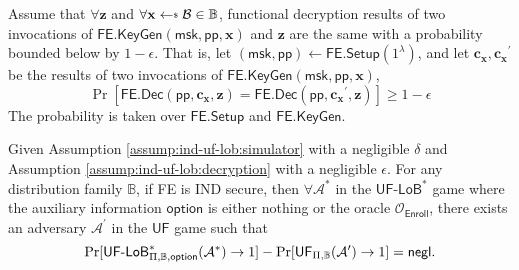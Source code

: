 \begin{assumption}
\label{assump:ind-uf-lob:decryption}
	Assume that $\forall \mathbf{z}$ and $\forall \mathbf{x} \getsdollar \mathcal{B} \in \mathbb{B}$, functional decryption results of two invocations of $\textsf{FE.KeyGen}( \textsf{msk}, \textsf{pp}, \mathbf{x})$ and $\mathbf{z}$ are the same with a probability bounded below by $1 - \epsilon$.
	That is, let $(\textsf{msk}, \textsf{pp}) \gets \textsf{FE.Setup}(1^\lambda)$, and let $\mathbf{c_x}, \mathbf{c_x}^\prime$ be the results of two invocations of $\textsf{FE.KeyGen}( \textsf{msk}, \textsf{pp}, \mathbf{x})$,
\[
	\Pr \left[
		\textsf{FE.Dec}(\textsf{pp}, \mathbf{c_x}, \mathbf{z}) = \textsf{FE.Dec}(\textsf{pp}, \mathbf{c_x}^\prime, \mathbf{z})
	\right] \geq 1 - \epsilon
\]
	The probability is taken over $\textsf{FE.Setup}$ and $\textsf{FE.KeyGen}$.

\end{assumption}


\begin{theorem}
\label{thm:ind-uf-lob2}

Given Assumption \ref{assump:ind-uf-lob:simulator} with a negligible $\delta$ and Assumption \ref{assump:ind-uf-lob:decryption} with a negligible $\epsilon$.
For any distribution family $\mathbb{B}$, if \textsf{FE} is IND secure, then $\forall \mathcal{A}^*$ in the $\textsf{UF-LoB}^*$ game where the auxiliary information $\textsf{option}$ is either nothing or the oracle $\mathcal{O}_{\textsf{Enroll}}$, there exists an adversary $\mathcal{A}^\prime$ in the $\textsf{UF}$ game such that 
\[
	\Pr[\textsf{UF-LoB}^*_{\Pi, \mathbb{B}, \textsf{option}}(\mathcal{A}^*) \to 1] - \Pr[\textsf{UF}_{\Pi, \mathbb{B}}(\mathcal{A}^\prime) \to 1] = \mathsf{negl}.
\]

\end{theorem}


